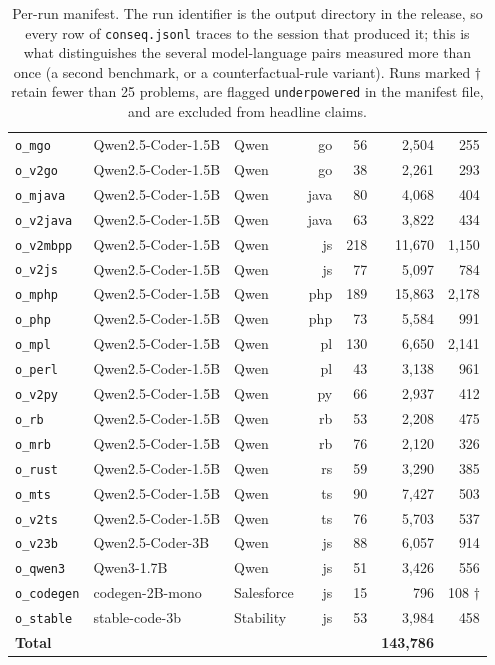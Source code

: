 \begin{table}[H]
\begin{tabular}{lllrrrr}
\texttt{o\_mgo} & Qwen2.5-Coder-1.5B & Qwen & go & 56 & 2,504 & 255 \\
\texttt{o\_v2go} & Qwen2.5-Coder-1.5B & Qwen & go & 38 & 2,261 & 293 \\
\texttt{o\_mjava} & Qwen2.5-Coder-1.5B & Qwen & java & 80 & 4,068 & 404 \\
\texttt{o\_v2java} & Qwen2.5-Coder-1.5B & Qwen & java & 63 & 3,822 & 434 \\
\texttt{o\_v2mbpp} & Qwen2.5-Coder-1.5B & Qwen & js & 218 & 11,670 & 1,150 \\
\texttt{o\_v2js} & Qwen2.5-Coder-1.5B & Qwen & js & 77 & 5,097 & 784 \\
\texttt{o\_mphp} & Qwen2.5-Coder-1.5B & Qwen & php & 189 & 15,863 & 2,178 \\
\texttt{o\_php} & Qwen2.5-Coder-1.5B & Qwen & php & 73 & 5,584 & 991 \\
\texttt{o\_mpl} & Qwen2.5-Coder-1.5B & Qwen & pl & 130 & 6,650 & 2,141 \\
\texttt{o\_perl} & Qwen2.5-Coder-1.5B & Qwen & pl & 43 & 3,138 & 961 \\
\texttt{o\_v2py} & Qwen2.5-Coder-1.5B & Qwen & py & 66 & 2,937 & 412 \\
\texttt{o\_rb} & Qwen2.5-Coder-1.5B & Qwen & rb & 53 & 2,208 & 475 \\
\texttt{o\_mrb} & Qwen2.5-Coder-1.5B & Qwen & rb & 76 & 2,120 & 326 \\
\texttt{o\_rust} & Qwen2.5-Coder-1.5B & Qwen & rs & 59 & 3,290 & 385 \\
\texttt{o\_mts} & Qwen2.5-Coder-1.5B & Qwen & ts & 90 & 7,427 & 503 \\
\texttt{o\_v2ts} & Qwen2.5-Coder-1.5B & Qwen & ts & 76 & 5,703 & 537 \\
\texttt{o\_v23b} & Qwen2.5-Coder-3B & Qwen & js & 88 & 6,057 & 914 \\
\texttt{o\_qwen3} & Qwen3-1.7B & Qwen & js & 51 & 3,426 & 556 \\
\texttt{o\_codegen} & codegen-2B-mono & Salesforce & js & 15 & 796 & 108 $\dagger$ \\
\texttt{o\_stable} & stable-code-3b & Stability & js & 53 & 3,984 & 458 \\
\midrule
\textbf{Total} & & & & & \textbf{143,786} & \\
\bottomrule
\end{tabular}
\caption{Per-run manifest. The run identifier is the output directory in the release, so every
row of \texttt{conseq.jsonl} traces to the session that produced it; this is what distinguishes
the several model-language pairs measured more than once (a second benchmark, or a
counterfactual-rule variant). Runs marked $\dagger$ retain fewer than 25 problems, are flagged
\texttt{underpowered} in the manifest file, and are excluded from headline claims.}
\label{tab:manifest}
\end{table}

